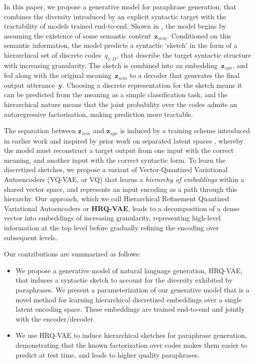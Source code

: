 \documentclass[11pt]{article}
\begin{document}
In this paper, we propose a generative model for paraphrase generation, that combines the diversity introduced by an explicit syntactic target with the tractability of models trained end-to-end. Shown in , the model begins by assuming the existence of some semantic content~$\textbf{z}_{sem}$. Conditioned on this semantic information, the model predicts a syntactic `sketch' in the form of a hierarchical set of discrete codes~$q_{1:D}$, that describe the target syntactic structure with increasing granularity. The sketch is combined into an embedding~$\textbf{z}_{syn}$, and fed along with the original meaning~$\textbf{z}_{sem}$ to a decoder that generates the final output utterance~$\textbf{y}$. Choosing a discrete representation for the sketch means it can be predicted from the meaning as a simple classification task, and the hierarchical nature means that the joint probability over the codes admits an autoregressive factorisation, making prediction more tractable.

The separation between $\textbf{z}_{sem}$ and $\textbf{z}_{syn}$ is induced by a training scheme introduced in earlier work  \cite{hosking-lapata-2021-factorising,huang-chang-2021-generating} and inspired by prior work on separated latent spaces \cite{chen-etal-2019-multi, bao-etal-2019-generating}, whereby the model must reconstruct a target output from one input with the correct meaning, and another input with the correct syntactic form. To learn the discretized sketches, we propose a variant of
Vector-Quantized Variational Autoencoders (VQ-VAE, or VQ) that learns
a \textit{hierarchy of embeddings} within a shared vector space, and represents an input encoding as
a path through this hierarchy. Our approach, which we call
Hierarchical Refinement Quantized Variational Autoencoders or
\textbf{HRQ-VAE}, leads to a decomposition of a dense vector into
embeddings of increasing granularity, representing high-level
information at the top level before gradually refining the encoding
over subsequent levels.








Our contributions are summarized as follows:

\begin{itemize}
    \vspace{-0.2cm}\item We propose a generative model of natural language generation, HRQ-VAE, that induces a syntactic sketch to account for the diversity exhibited by paraphrases. We present a parameterization of our generative model that is a novel method for learning hierarchical discretized embeddings over a single latent encoding space. These embeddings are trained end-to-end and jointly with the encoder/decoder.
    \vspace{-0.2cm}\item We use HRQ-VAE to induce hierarchical
    sketches for paraphrase generation, demonstrating that the known
    factorization over codes makes them easier to predict at
    test time, and leads to higher quality paraphrases.
\end{itemize}
\end{document}
